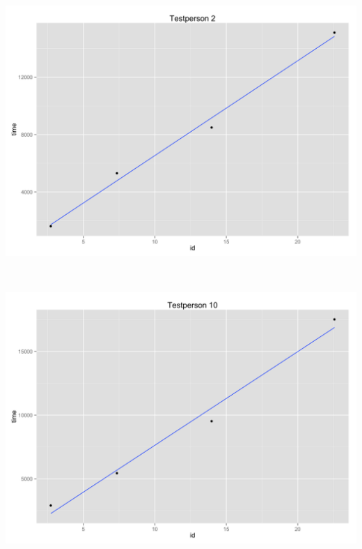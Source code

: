 \begin{minipage}{\linewidth}
	\begin{minipage}[b]{.45\linewidth}
		\includegraphics[width=\textwidth]{images/plots/plot_model_test_spiraling_1}
		\label{fig:spiralingtest1}
	\end{minipage}
	\begin{minipage}[b]{0.1\linewidth}
	~
	\end{minipage}
	\begin{minipage}[b]{0.45\linewidth}
		\includegraphics[width=\textwidth]{images/plots/plot_model_test_spiraling_2}
		\label{fig:spiralingtest2}
	\end{minipage}
\end{minipage}

